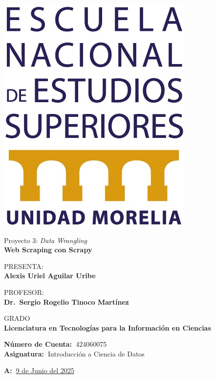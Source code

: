\documentclass[12pt,a4paper]{article}
\begin{document}
\begin{titlepage}
\begin{minipage}[c]{0.1\textwidth}
        \includegraphics[width=\textwidth]{logo_enes.jpg}
    \end{minipage}
    \vspace{1.5cm}
    
    \centering

    {\large{Proyecto 3: \emph{Data Wrangling}\\}}
    {\Large\textbf{Web Scraping con Scrapy}}
    \vspace{1cm}

    {{PRESENTA:\\}}
    {\large\textbf{Alexis Uriel Aguilar Uribe}}
    \vspace{0.5cm} 

    {{PROFESOR:\\}}
    {\large\textbf{Dr.\ Sergio Rogelio Tinoco Martínez}}
    \vspace{1cm}

    {{GRADO\\}}
    {\large\textbf{Licenciatura en Tecnologías para la Información en Ciencias}}
    \vspace{1cm}

    \flushleft
    {\textbf{Número de Cuenta:\ }424060075}\\
    {\textbf{Asignatura:\ }Introducción a Ciencia de Datos}
    \vspace{1cm}

    \flushright
    {\textbf{A:\ }\underline{9 de Junio del 2025}}
    \vfill

\end{titlepage}

\newpage
\end{document}
